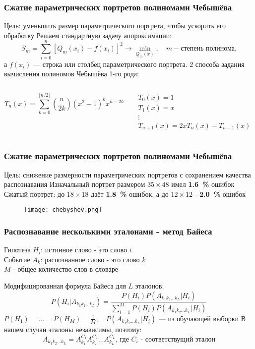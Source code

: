 \begin{frame}
\frametitle{\small Сжатие параметрических портретов полиномами Чебышёва}
\small
Цель: уменьшить размер параметрического портрета, чтобы ускорить его обработку 
\bigbreak
Решаем стандартную задачу аппроксимации:
$$
S_m = \sum_{i=0}^{n} \left[Q_m (x_i) - f(x_i) \right]^2 \rightarrow \min_{Q_m (x)} ,\quad m - \text{степень полинома,}
$$
а $f(x_i)$ --- строка или столбец параметрического портрета.
\vfill
2 способа задания вычисления полиномов Чебышёва 1-го рода:
\begin{columns}
	\begin{column}{0.5\textwidth}
		$$
		T_n (x) = \sum_{k=0}^{\lfloor n/2 \rfloor} \binom{n}{2k} (x^2 - 1)^k x^{n-2k}
		$$
	\end{column}
	\begin{column}{0.5\textwidth}
		$$
		\begin{gathered}
		T_0 (x) = 1 \\
		T_1 (x) = x \\
		\vdots \\
		T_{n+1} (x) = 2x T_n (x) - T_{n-1} (x)
		\end{gathered}
		$$
	\end{column}
\end{columns}

\end{frame}

\begin{frame}
\frametitle{\small Сжатие параметрических портретов полиномами Чебышёва}
\footnotesize
\vfill
Цель: снижение размерности параметрических портретов с сохранением качества распознавания
\vfill
Изначальный портрет размером $35 \times 48$ имел \textbf{1.6~\%} ошибок \\
Сжатый портрет: до $18 \times 18$ даёт \textbf{1.8~\%} ошибок, а до $12 \times 12$ - \textbf{2.0~\%} ошибок
\vfill
\begin{figure}[h]
	\centering
	\texttt{[image: chebyshev.png]}
\end{figure}
\vfill
\end{frame}

\begin{frame}
\frametitle{\normalsize Распознавание несколькими эталонами - метод Байеса}
\small
\vfill
Гипотеза $H_i$: истинное слово - это слово $i$ \\
Событие $A_k$: распознанное слово - это слово $k$ \\
$M$ - общее количество слов в словаре \\
\bigbreak

Модифицированная формула Байеса для $L$ эталонов:
$$
P(H_i|A_{k_1 k_2 \dots k_L}) =
\frac{P(H_i) P(A_{k_1 k_2 \dots k_L}|H_i)}{\sum_{i=1}^M P(H_i) P(A_{k_1 k_2 \dots k_L}|H_i)}
$$
{\footnotesize
$P(H_1) = \dots = P(H_M) = \frac{1}{M}, \quad P(A_{k_1 k_2 \dots k_L}|H_i)$ --- из обучающей выборки
}
\vfill
В нашем случаи эталоны независимы, поэтому:
$$
A_{k_1 k_2 \dots k_L} = A_{k_1}^{C_1} A_{k_2}^{C_2} \dots A_{k_L}^{C_L} \text{, где } C_i \text{ - соответствущий эталон}
$$
\end{frame}

